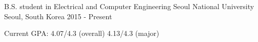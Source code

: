 

\begin{cventries}

  \cventry
    {B.S. student in Electrical and Computer Engineering}
    {Seoul National University} %
    {Seoul, South Korea} %
    {2015 - Present}
    {
      \begin{cvitems} %
        \item {Current GPA: 4.07/4.3 (overall) 4.13/4.3 (major)}
      \end{cvitems}
    }
    
\end{cventries}
